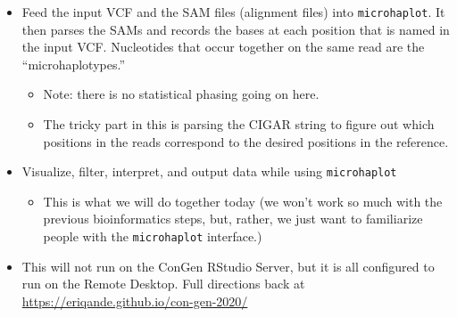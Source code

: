 \documentclass[letter,graphicx]{beamer}
\begin{document}
\begin{frame}{}
\begin{itemize}
\item Feed the input VCF and the SAM files (alignment files) into {\tt microhaplot}.  It then parses the SAMs and records the bases at each position that is named in the input VCF.  Nucleotides that occur together
on the same read are the ``microhaplotypes.'' 
\begin{itemize}
 \item Note: there is no statistical phasing going on here.
 \item The tricky part in this is parsing the CIGAR string to figure out which positions in the reads
 correspond to the desired positions in the reference.
\end{itemize}

\item Visualize, filter, interpret, and output data while using {\tt microhaplot}
\begin{itemize}
\item This is what we will do together today (we won't work so much with the previous bioinformatics steps,
but, rather, we just want to familiarize people with the {\tt microhaplot} interface.) 
\end{itemize}

\item This will not run on the ConGen RStudio Server, but it is all configured to run on the Remote Desktop.  Full directions back at \url{https://eriqande.github.io/con-gen-2020/}

\end{itemize}


\end{frame}
\end{document}

